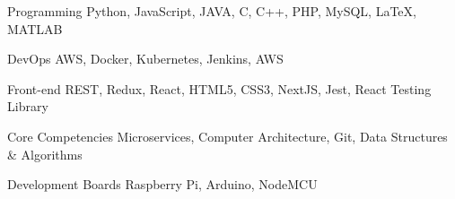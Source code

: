 

\begin{cvskills}

  \cvskill
    {Programming} %
    {Python, JavaScript, JAVA, C, C++, PHP, MySQL, LaTeX, MATLAB} %

  \cvskill
    {DevOps} %
    {AWS, Docker, Kubernetes, Jenkins, AWS } %

  \cvskill
    {Front-end} %
    {REST, Redux, React, HTML5, CSS3, NextJS, Jest, React Testing Library} %

  \cvskill
    {Core Competencies} %
    {Microservices, Computer Architecture, Git, Data Structures \& Algorithms} %

  \cvskill
    {Development Boards} %
    {Raspberry Pi, Arduino, NodeMCU}%

\end{cvskills}
